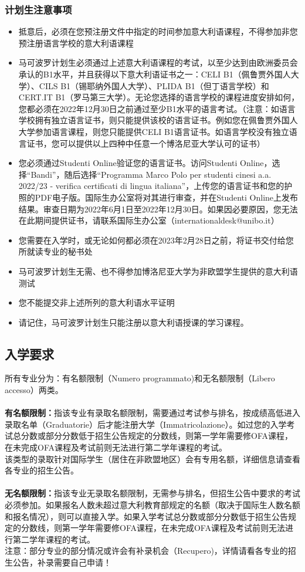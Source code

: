 \subsubsection{计划生注意事项}
\begin{itemize}
\item 抵意后，必须在您预注册文件中指定的时间参加意大利语课程，不得参加非您预注册语言学校的意大利语课程 
\item 马可波罗计划生必须通过上述意大利语课程的考试，以至少达到由欧洲委员会承认的B1水平，并且获得以下意大利语证书之一：CELI B1（佩鲁贾外国人大学）、CILS B1（锡耶纳外国人大学）、PLIDA B1（但丁语言学校）和CERT.IT B1（罗马第三大学）。无论您选择的语言学校的课程进度安排如何，您都必须在2022年12月30日之前通过至少B1水平的语言考试。（注意：如语言学校拥有独立语言证书，则只能提供该校的语言证书。例如您在佩鲁贾外国人大学参加语言课程，则您只能提供CELI B1语言证书。如语言学校没有独立语言证书，您可以提供以上四种中任意一个博洛尼亚大学认可的证书）
\item 您必须通过Studenti Online验证您的语言证书。访问Studenti Online，选择“Bandi”，随后选择“Programma Marco Polo per studenti cinesi a.a. 2022/23 - verifica certificati di lingua italiana”，上传您的语言证书和您的护照的PDF电子版。国际生办公室将对其进行审查，并在Studenti Online上发布结果。审查日期为2022年6月1日至2022年12月30日。如果因必要原因，您无法在此期间提供证书，请联系国际生办公室（internationaldesk@unibo.it）
\item 您需要在入学时，或无论如何都必须在2023年2月28日之前，将证书交付给您所就读专业的秘书处
\item 马可波罗计划生无需、也不得参加博洛尼亚大学为非欧盟学生提供的意大利语测试
\item 您不能提交非上述所列的意大利语水平证明
\item 请记住，马可波罗计划生只能注册以意大利语授课的学习课程。
\end{itemize}


\subsection{入学要求}
所有专业分为：有名额限制（Numero programmato)和无名额限制（Libero accesso）两类。\\
\\
\textbf{有名额限制：}指该专业有录取名额限制，需要通过考试参与排名，按成绩高低进入录取名单（Graduatorie）后才能注册大学（Immatricolazione）。如过您的入学考试总分数或部分分数低于招生公告规定的分数线，则第一学年需要修OFA课程，在未完成OFA课程及考试前则无法进行第二学年课程的考试。\\
该类型的录取针对国际学生（居住在非欧盟地区）会有专用名额，详细信息请查看各专业的招生公告。\\
\\
\textbf{无名额限制：}指该专业无录取名额限制，无需参与排名，但招生公告中要求的考试必须参加。如果报名人数未超过意大利教育部规定的名额（取决于国际生人数名额和报名情况），则可以直接入学。如果入学考试总分数或部分分数低于招生公告规定的分数线，则第一学年需要修OFA课程，在未完成OFA课程及考试前则无法进行第二学年课程的考试。
\\
注意：部分专业的部分情况或许会有补录机会（Recupero)，详情请看各专业的招生公告，补录需要自己申请！

